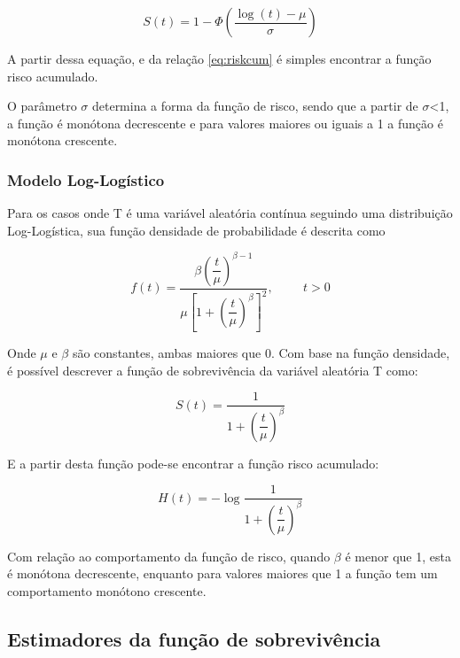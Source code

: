 \documentclass[12pt,a4paper]{article}
\begin{document}
\begin{equation} \label{eq:LNSurv}
 S(t) = 1 - \Phi\left(\dfrac{\log(t) - \mu}{\sigma}\right)
\end{equation}

A partir dessa equação, e da relação \ref{eq:riskcum} é simples encontrar a função risco acumulado.

O parâmetro $\sigma$ determina a forma da função de risco, sendo que a partir de $\sigma$<1, a função é monótona decrescente e para valores maiores ou iguais a 1 a função é monótona crescente.

\subsubsection{Modelo Log-Logístico}

Para os casos onde T é uma variável aleatória contínua seguindo uma distribuição Log-Logística, sua função densidade de probabilidade é descrita como

\begin{equation}
  f(t) = \dfrac{\beta\left(\dfrac{t}{\mu}\right)^{\beta - 1}}{\mu\left[1+\left(\dfrac{t}{\mu}\right)^{\beta}\right]^2}, \hspace{1cm} t > 0
\end{equation}

Onde $\mu$ e $\beta$ são constantes, ambas maiores que 0. Com base na função densidade, é possível descrever a função de sobrevivência da variável aleatória T como:

\begin{equation} \label{eq: LLSurv}
  S(t) = \dfrac{1}{1 + \left(\dfrac{t}{\mu}\right)^{\beta}}
\end{equation}

E a partir desta função pode-se encontrar a função risco acumulado:

\begin{equation} \label{eq: HazLL}
H(t) = - \log{\dfrac{1}{1 + \left(\dfrac{t}{\mu}\right)^{\beta}}}
\end{equation}

Com relação ao comportamento da função de risco, quando $\beta$ é menor que 1, esta é monótona decrescente, enquanto para valores maiores que 1 a função tem um comportamento monótono crescente.

\subsection{Estimadores da função de sobrevivência}
\end{document}
